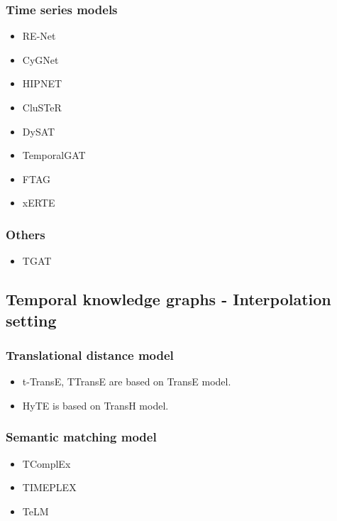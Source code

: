 \documentclass[12pt]{article}
\begin{document}
\subsubsection{Time series models}

\begin{itemize}
    \item RE-Net
    \item CyGNet
    \item HIPNET
    \item CluSTeR
    \item DySAT
    \item TemporalGAT
    \item FTAG
    \item xERTE
\end{itemize}

\subsubsection{Others}

\begin{itemize}
    \item TGAT
\end{itemize}

\subsection{Temporal knowledge graphs - Interpolation setting}

\subsubsection{Translational distance model}

\begin{itemize}
    \item t-TransE, TTransE are based on TransE model.
    \item HyTE is based on TransH model.
\end{itemize}

\subsubsection{Semantic matching model}

\begin{itemize}
    \item TComplEx
    \item TIMEPLEX
    \item TeLM
\end{itemize}
\end{document}

